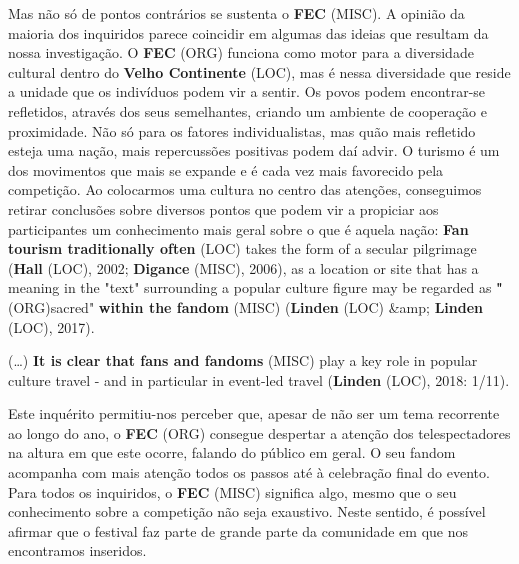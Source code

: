 \documentclass[12pt,a4paper]{article}
\begin{document}
Mas  não  só  de  pontos  contrários  se  sustenta  o  \textbf{FEC} (MISC).  A  opinião  da  maioria  dos inquiridos parece coincidir em algumas das ideias que resultam da nossa investigação. O \textbf{FEC} (ORG) funciona como motor para a diversidade cultural dentro do \textbf{Velho Continente} (LOC), mas é nessa diversidade que reside a unidade que os indivíduos podem vir a sentir. Os povos podem  encontrar-se  refletidos,  através  dos  seus  semelhantes,  criando  um  ambiente  de cooperação e proximidade. Não só para os fatores individualistas, mas quão mais refletido esteja  uma  nação,  mais  repercussões  positivas  podem  daí  advir.  O  turismo  é  um  dos movimentos  que  mais  se  expande  e  é  cada  vez  mais  favorecido  pela  competição.  Ao colocarmos  uma  cultura  no  centro  das  atenções,  conseguimos  retirar  conclusões  sobre diversos pontos que podem vir a propiciar aos participantes um conhecimento mais geral sobre o que é aquela nação: \textbf{Fan  tourism  traditionally  often} (LOC)  takes  the  form  of  a  secular  pilgrimage  (\textbf{Hall} (LOC),  2002; \textbf{Digance} (MISC), 2006), as a location or site that has a meaning in the "text" surrounding a popular culture figure may be regarded as \textbf{"} (ORG)sacred" \textbf{within the fandom} (MISC) (\textbf{Linden} (LOC) \&amp; \textbf{Linden} (LOC), 2017).

(…) \textbf{It is clear that fans and fandoms} (MISC) play a key role in popular culture travel - and in particular in event-led travel (\textbf{Linden} (LOC), 2018: 1/11).

Este inquérito permitiu-nos perceber que, apesar de não ser um tema recorrente ao longo do ano, o \textbf{FEC} (ORG) consegue despertar a atenção dos telespectadores na altura em que este ocorre, falando do público em geral. O seu fandom acompanha com  mais atenção todos os passos até à celebração final do evento. Para todos os inquiridos, o \textbf{FEC} (MISC) significa algo,  mesmo  que  o  seu  conhecimento  sobre  a  competição  não  seja  exaustivo.  Neste sentido, é possível afirmar que o festival faz parte de grande parte da comunidade em que nos encontramos inseridos.
\end{document}
